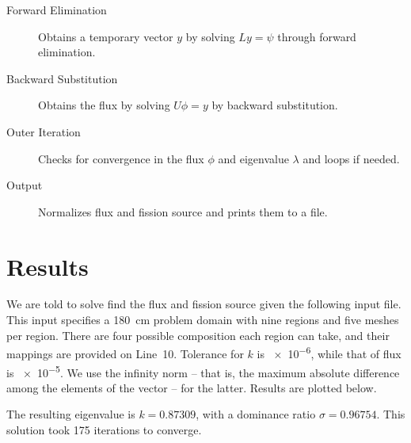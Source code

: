 \documentclass[fleqn,11pt]{article}
\begin{document}
\begin{description}
  \item [Forward Elimination] Obtains a temporary vector \(y\) by solving \(L y = \psi\) through forward elimination.
  
  \item [Backward Substitution] Obtains the flux by solving \(U \phi = y\) by backward substitution.
  
  \item [Outer Iteration] Checks for convergence in the flux \(\phi\) and eigenvalue \(\lambda\) and loops if needed.
  
  \item [Output] Normalizes flux and fission source and prints them to a file.
\end{description}

\section{Results}
We are told to solve find the flux and fission source given 
the following input file. This input specifies a \SI{180}{\centi\meter}
problem domain with nine regions and five meshes per region.
There are four possible composition each region can take,
and their mappings are provided on Line~10. Tolerance for 
\(k\) is \num{e-6}, while that of flux is \num{e-5}. We use 
the infinity norm -- that is, the maximum absolute difference 
among the elements of the vector -- for the latter. Results 
are plotted below.



The resulting eigenvalue is \(k = 0.87309\), with a dominance
ratio \(\sigma = 0.96754\). This solution took 175 iterations
to converge.

\begin{center}
\end{center}
\end{document}
